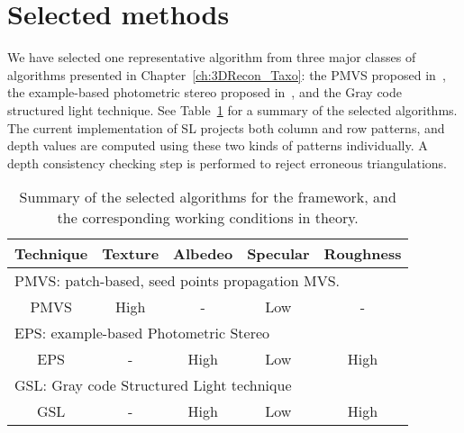 \section{Selected methods}
We have selected one representative algorithm from three major classes of algorithms presented in Chapter~\ref{ch:3DRecon_Taxo}: the PMVS proposed in~\cite{furukawa2010accurate}, the example-based photometric stereo proposed in~\cite{hertzmann2005example}, and the Gray code structured light technique. See Table~\ref{tab:selected_algos} for a summary of the selected algorithms. The current implementation of SL projects both column and row patterns, and depth values are computed using these two kinds of patterns individually. A depth consistency checking step is performed to reject erroneous triangulations.
\begin{table}[!htbp]
\centering
\begin{tabular}{c|c|c|c|c}
\toprule
Technique & Texture & Albedeo & Specular & Roughness\\
\midrule
\multicolumn{5}{l}{PMVS: patch-based, seed points propagation MVS.}\\
\midrule
PMVS & High & - & Low & -\\
\midrule
\multicolumn{5}{l}{EPS: example-based Photometric Stereo}\\
\midrule
EPS & - & High & Low & High \\
\midrule
\multicolumn{5}{l}{GSL: Gray code Structured Light technique}\\
\midrule
GSL & - & High & Low & High\\
\bottomrule
\end{tabular}
\caption{Summary of the selected algorithms for the framework, and the corresponding working conditions in theory.}
\label{tab:selected_algos}
\end{table}

